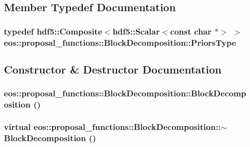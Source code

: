 \subsection{Member Typedef Documentation}
\hypertarget{classeos_1_1proposal__functions_1_1BlockDecomposition_a892047be5924542e4defaa86b30ad6fd}{
\subsubsection[{PriorsType}]{\setlength{\rightskip}{0pt plus 5cm}typedef {\bf hdf5::Composite}$<${\bf hdf5::Scalar}$<$const char $\ast$$>$ $>$ {\bf eos::proposal\_\-functions::BlockDecomposition::PriorsType}}}
\label{classeos_1_1proposal__functions_1_1BlockDecomposition_a892047be5924542e4defaa86b30ad6fd}


\subsection{Constructor \& Destructor Documentation}
\hypertarget{classeos_1_1proposal__functions_1_1BlockDecomposition_a10f540b481d3278044e1b59821ee57f8}{
\subsubsection[{BlockDecomposition}]{\setlength{\rightskip}{0pt plus 5cm}eos::proposal\_\-functions::BlockDecomposition::BlockDecomposition ()}}
\label{classeos_1_1proposal__functions_1_1BlockDecomposition_a10f540b481d3278044e1b59821ee57f8}
\hypertarget{classeos_1_1proposal__functions_1_1BlockDecomposition_aba384f3920606bc7ec8a0ca4f57f68f5}{
\subsubsection[{$\sim$BlockDecomposition}]{\setlength{\rightskip}{0pt plus 5cm}virtual eos::proposal\_\-functions::BlockDecomposition::$\sim$BlockDecomposition ()}}
\label{classeos_1_1proposal__functions_1_1BlockDecomposition_aba384f3920606bc7ec8a0ca4f57f68f5}


